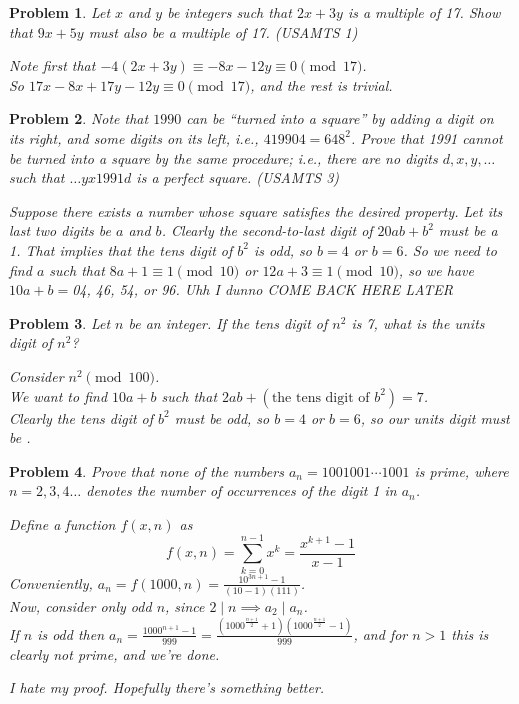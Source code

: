 \documentclass[12pt]{scrartcl}
\newtheorem{a_problem}{Problem}
\begin{document}
\setcounter{a_problem}{386}
\begin{a_problem}
	Let $x$ and $y$ be integers such that $2x+3y$ is a multiple of 17. Show that $9x + 5y$ must also be a multiple of 17. (USAMTS 1)
	\begin{soln}
		Note first that $-4(2x + 3y) \equiv -8x - 12y \equiv 0 \pmod{17}$. \\
		So $17x - 8x + 17y - 12y \equiv 0 \pmod{17}$, and the rest is trivial.
	\end{soln}
\end{a_problem}

\begin{a_problem}
	Note that $1990$ can be ``turned into a square'' by adding a digit on its right, and some digits on its left, i.e., $419904=648^2$. Prove that 1991 cannot be turned into a square by the same procedure; i.e., there are no digits $d,x,y, \dots$ such that $\dots yx1991d$ is a perfect square. (USAMTS 3)
	\begin{soln}
		Suppose there exists a number whose square satisfies the desired property. Let its last two digits be $a$ and $b$.
		Clearly the second-to-last digit of $20ab + b^2$ must be a 1. That implies that the tens digit of $b^2$ is odd, so $b=4$ or $b=6$. So we need to find $a$ such that $8a + 1 \equiv 1 \pmod{10}$ or $12a + 3 \equiv 1 \pmod{10}$, so we have $10a+b = $04, 46, 54, or 96.
		Uhh I dunno COME BACK HERE LATER
	\end{soln}
\end{a_problem}

\setcounter{a_problem}{392}
\begin{a_problem}
	Let $n$ be an integer. If the tens digit of $n^2$ is 7, what is the units digit of $n^2$?
	\begin{soln}
		Consider $n^2 \pmod{100}$. \\
		We want to find $10a+b$ such that $2ab + (\text{the tens digit of $b^2$}) = 7$. \\
		Clearly the tens digit of $b^2$ must be odd, so $b=4$ or $b=6$, so our units digit must be .
	\end{soln}
\end{a_problem}

\begin{a_problem}
	Prove that none of the numbers $a_n = 1001001\cdots1001$ is prime, where $n=2,3,4\dots$ denotes the number of occurrences of the digit 1 in $a_n$.
	\begin{soln}
		Define a function $f(x,n)$ as
		\[f(x,n) = \sum_{k=0}^{n-1}x^k = \frac{x^{k+1}-1}{x - 1} \]
			Conveniently, $a_n = f(1000,n) = \frac{10^{3n+1} - 1}{(10 - 1)(111)}$. \\
		Now, consider only odd $n$, since $2 \mid n \implies a_2 \mid a_n$. \\
		If $n$ is odd then $a_n = \frac{1000^{n+1}-1}{999} = \frac{(1000^{\frac{n+1}{2}} + 1)(1000^{\frac{n+1}2} - 1)}{999}$, and for $n>1$ this is clearly not prime, and we're done.
	\end{soln}
	\begin{remark*}
		I hate my proof. Hopefully there's something better.
	\end{remark*}
\end{a_problem}
\end{document}
